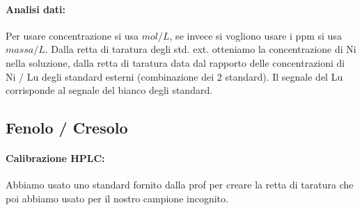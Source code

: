 \documentclass{article}
\begin{document}
\paragraph{Analisi dati:} Per usare concentrazione si usa $mol / L$, se invece si vogliono usare i ppm si usa $massa / L$. Dalla retta di taratura degli std. ext. otteniamo la concentrazione di Ni nella soluzione, dalla retta di taratura data dal rapporto delle concentrazioni di Ni / Lu degli standard esterni (combinazione dei 2 standard). Il segnale del Lu corrisponde al segnale del bianco degli standard.

\subsection{Fenolo / Cresolo}
\paragraph{Calibrazione HPLC:} Abbiamo usato uno standard fornito dalla prof per creare la retta di taratura che poi abbiamo usato per il nostro campione incognito.
\end{document}
